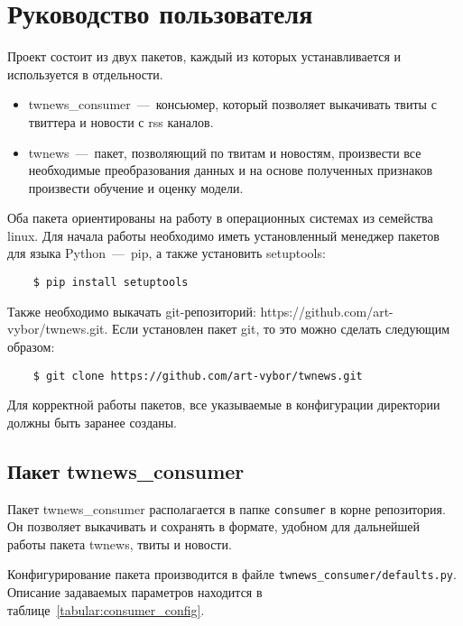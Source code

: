 \section{Руководство пользователя}
    Проект состоит из двух пакетов, каждый из которых устанавливается и используется в отдельности.
    \begin{itemize}
        \item twnews\_consumer~---~консьюмер, который позволяет выкачивать твиты с твиттера и новости с rss каналов.
        \item twnews~---~пакет, позволяющий по твитам и новостям, произвести все необходимые преобразования данных и на основе полученных признаков произвести обучение и оценку модели.
    \end{itemize}

    Оба пакета ориентированы на работу в операционных системах из семейства linux. Для начала работы необходимо иметь установленный менеджер пакетов для языка Python~---~pip, а также установить setuptools:
    \begin{lstlisting}
    $ pip install setuptools
    \end{lstlisting}
    Также необходимо выкачать git-репозиторий: https://github.com/art-vybor/twnews.git.
    Если установлен пакет git, то это можно сделать следующим образом:
    \begin{lstlisting}
    $ git clone https://github.com/art-vybor/twnews.git
    \end{lstlisting}

    Для корректной работы пакетов, все указываемые в конфигурации директории должны быть заранее созданы.

    \subsection{Пакет twnews\_consumer}
        Пакет twnews\_consumer располагается в папке \lstinline{consumer} в корне репозитория.
        Он позволяет выкачивать и сохранять в формате, удобном для дальнейшей работы пакета twnews, твиты и новости.

        Конфигурирование пакета производится в файле \lstinline{twnews_consumer/defaults.py}.
        Описание задаваемых параметров находится в таблице~\ref{tabular:consumer_config}.

